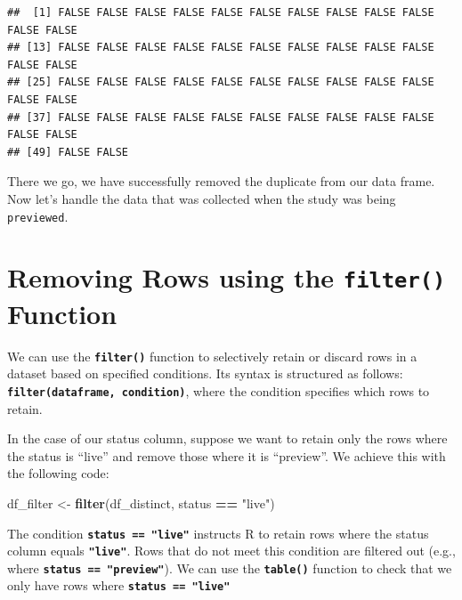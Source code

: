 \documentclass[
]{book}
\newenvironment{Shaded}{\begin{snugshade}}{\end{snugshade}}
\newcommand{\FunctionTok}[1]{\textcolor[rgb]{0.13,0.29,0.53}{\textbf{#1}}}
\newcommand{\NormalTok}[1]{#1}
\newcommand{\OtherTok}[1]{\textcolor[rgb]{0.56,0.35,0.01}{#1}}
\newcommand{\SpecialCharTok}[1]{\textcolor[rgb]{0.81,0.36,0.00}{\textbf{#1}}}
\newcommand{\StringTok}[1]{\textcolor[rgb]{0.31,0.60,0.02}{#1}}
\begin{document}
\begin{verbatim}
##  [1] FALSE FALSE FALSE FALSE FALSE FALSE FALSE FALSE FALSE FALSE FALSE FALSE
## [13] FALSE FALSE FALSE FALSE FALSE FALSE FALSE FALSE FALSE FALSE FALSE FALSE
## [25] FALSE FALSE FALSE FALSE FALSE FALSE FALSE FALSE FALSE FALSE FALSE FALSE
## [37] FALSE FALSE FALSE FALSE FALSE FALSE FALSE FALSE FALSE FALSE FALSE FALSE
## [49] FALSE FALSE
\end{verbatim}

There we go, we have successfully removed the duplicate from our data frame. Now let's handle the data that was collected when the study was being \texttt{previewed}.

\hypertarget{removing-rows-using-the-filter-function}{%
\section{\texorpdfstring{Removing Rows using the \texttt{filter()} Function}{Removing Rows using the filter() Function}}\label{removing-rows-using-the-filter-function}}

We can use the \textbf{\texttt{filter()}} function to selectively retain or discard rows in a dataset based on specified conditions. Its syntax is structured as follows: \textbf{\texttt{filter(dataframe,\ condition)}}, where the condition specifies which rows to retain.

In the case of our status column, suppose we want to retain only the rows where the status is ``live'' and remove those where it is ``preview''. We achieve this with the following code:

\begin{Shaded}
\begin{Highlighting}[]
\NormalTok{df\_filter }\OtherTok{\textless{}{-}} \FunctionTok{filter}\NormalTok{(df\_distinct, status }\SpecialCharTok{==} \StringTok{"live"}\NormalTok{)}
\end{Highlighting}
\end{Shaded}

The condition \textbf{\texttt{status\ ==\ "live"}} instructs R to retain rows where the status column equals \textbf{\texttt{"live"}}. Rows that do not meet this condition are filtered out (e.g., where \textbf{\texttt{status\ ==\ "preview"}}). We can use the \textbf{\texttt{table()}} function to check that we only have rows where \textbf{\texttt{status\ ==\ "live"}}

\begin{Shaded}
\end{Shaded}
\end{document}
